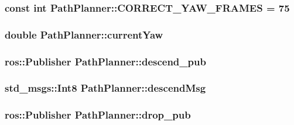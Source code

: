 \subsubsection[{\texorpdfstring{C\+O\+R\+R\+E\+C\+T\+\_\+\+Y\+A\+W\+\_\+\+F\+R\+A\+M\+ES}{CORRECT_YAW_FRAMES}}]{\setlength{\rightskip}{0pt plus 5cm}const int Path\+Planner\+::\+C\+O\+R\+R\+E\+C\+T\+\_\+\+Y\+A\+W\+\_\+\+F\+R\+A\+M\+ES = 75}\hypertarget{classPathPlanner_ab80757ecd2962cc2e5bd64c300e31628}{}\label{classPathPlanner_ab80757ecd2962cc2e5bd64c300e31628}
\subsubsection[{\texorpdfstring{current\+Yaw}{currentYaw}}]{\setlength{\rightskip}{0pt plus 5cm}double Path\+Planner\+::current\+Yaw}\hypertarget{classPathPlanner_a069162f445adcdef1e916ce8d43fd34a}{}\label{classPathPlanner_a069162f445adcdef1e916ce8d43fd34a}
\subsubsection[{\texorpdfstring{descend\+\_\+pub}{descend_pub}}]{\setlength{\rightskip}{0pt plus 5cm}ros\+::\+Publisher Path\+Planner\+::descend\+\_\+pub}\hypertarget{classPathPlanner_af0db2ddfb46fd54f8c8b942b44f67e75}{}\label{classPathPlanner_af0db2ddfb46fd54f8c8b942b44f67e75}
\subsubsection[{\texorpdfstring{descend\+Msg}{descendMsg}}]{\setlength{\rightskip}{0pt plus 5cm}std\+\_\+msgs\+::\+Int8 Path\+Planner\+::descend\+Msg}\hypertarget{classPathPlanner_ad7a30801fb56f1f2a5bf02d99b21ca5a}{}\label{classPathPlanner_ad7a30801fb56f1f2a5bf02d99b21ca5a}
\subsubsection[{\texorpdfstring{drop\+\_\+pub}{drop_pub}}]{\setlength{\rightskip}{0pt plus 5cm}ros\+::\+Publisher Path\+Planner\+::drop\+\_\+pub}\hypertarget{classPathPlanner_a5950dcdaa13fde281ad87bc06bb4221c}{}\label{classPathPlanner_a5950dcdaa13fde281ad87bc06bb4221c}
